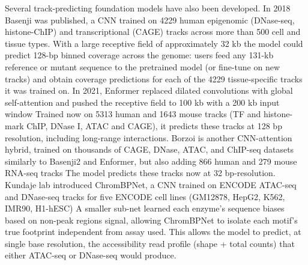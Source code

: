 
Several track-predicting foundation models have also been developed. In 2018 Basenji was published, a CNN trained on \num{4229} human epigenomic (DNase-seq, histone-ChIP) and transcriptional (CAGE) tracks across more than 500 cell and tissue types. With a large receptive field of approximately 32 kb the model could predict 128-bp binned coverage across the genome: users feed any 131-kb reference or mutant sequence to the pretrained model (or fine-tune on new tracks) and obtain coverage predictions for each of the \num{4229} tissue-specific tracks it was trained on. In 2021, Enformer replaced dilated convolutions with global self-attention and pushed the receptive field to 100 kb with a 200 kb input window Trained now on \num{5313} human and \num{1643} mouse tracks (TF and histone-mark ChIP, DNase I, ATAC and CAGE), it predicts these tracks at 128 bp resolution, including long-range interactions. Borzoi is another CNN-attention hybrid, trained on thousands of CAGE, DNase, ATAC, and ChIP-seq datasets similarly to Basenji2 and Enformer, but also adding 866 human and 279 mouse RNA-seq tracks The model predicts these tracks now at 32 bp-resolution. Kundaje lab introduced ChromBPNet, a CNN trained on ENCODE ATAC-seq and DNase-seq tracks for five ENCODE cell lines (GM12878, HepG2, K562, IMR90, H1-hESC) A smaller sub-net learned each enzyme's sequence biases based on non-peak regions signal, allowing ChromBPNet to isolate each motif's true footprint independent from assay used. This allows the model to predict, at single base resolution, the accessibility read profile (shape + total counts) that either ATAC-seq or DNase-seq would produce.

